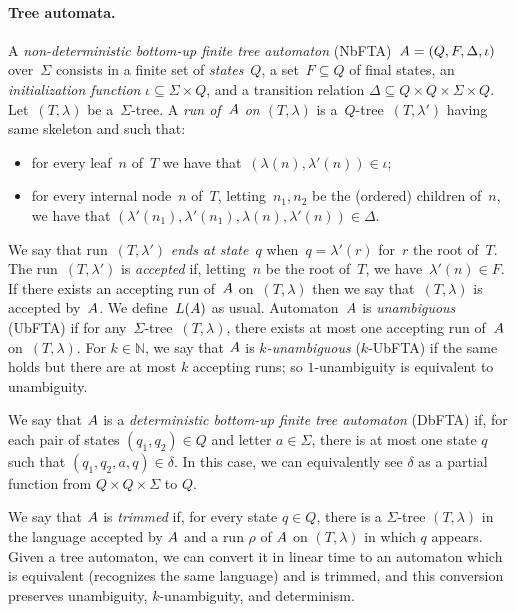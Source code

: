 \paragraph*{Tree automata.}
A \emph{non-deterministic bottom-up finite tree automaton} (NbFTA)~$A =
(Q,F,\Delta,\iota)$ over~$\Sigma$ consists in a finite set of
\emph{states}~$Q$, a set~$F \subseteq Q$ of final states, an
\emph{initialization function} $\iota \subseteq \Sigma \times Q$, and a transition
relation $\Delta \subseteq Q \times Q \times \Sigma \times Q$.
Let~$(T,\lambda)$ be a~$\Sigma$-tree.  A \emph{run of~$A$ on $(T,\lambda)$} is
a~$Q$-tree~$(T,\lambda')$ having same skeleton and such that:
\begin{itemize}
  \item for every leaf~$n$ of~$T$ we have that~$(\lambda(n),\lambda'(n))\in \iota$;
  \item for every internal node~$n$ of~$T$, letting~$n_1,n_2$ be the (ordered) children of~$n$,
        we have that $(\lambda'(n_1),\lambda'(n_1),\lambda(n),\lambda'(n)) \in \Delta$.
\end{itemize}
We say that run~$(T,\lambda')$ \emph{ends at state~$q$} when~$q = \lambda'(r)$
for~$r$ the root of~$T$.  The run~$(T,\lambda')$ is \emph{accepted} if,
letting~$n$ be the root of~$T$, we have~$\lambda'(n)\in F$. If there exists an
accepting run of~$A$ on~$(T,\lambda)$ then we say that~$(T,\lambda)$ is
accepted by~$A$. We define~$L(A)$ as usual. Automaton~$A$ is \emph{unambiguous} (UbFTA) if
for any~$\Sigma$-tree~$(T,\lambda)$, there exists at most one accepting run
of~$A$ on~$(T,\lambda)$.
For $k \in \mathbb{N}$, we say that $A$ is \emph{$k$-unambiguous} ($k$-UbFTA) if the same holds but there are at most $k$ accepting runs; so $1$-unambiguity is equivalent to unambiguity.

We say that $A$ is a \emph{deterministic bottom-up finite tree automaton}
(DbFTA) if, for each pair of states $(q_1, q_2) \in Q$ and letter $a \in
\Sigma$, there is at most one state $q$ such that $(q_1, q_2, a, q) \in \delta$.
In this case, we can equivalently see $\delta$ as a partial function from $Q
\times Q \times \Sigma$ to $Q$.

We say that $A$ is \emph{trimmed} if, for every state $q \in Q$, there is a
$\Sigma$-tree $(T,\lambda)$ in the language accepted by $A$ and a run $\rho$ of
$A$ on $(T, \lambda)$ in which $q$ appears. Given a tree automaton, we can
convert it in linear time to an automaton which is equivalent (recognizes the
same language) and is trimmed, and this conversion preserves unambiguity,
$k$-unambiguity, and determinism.

